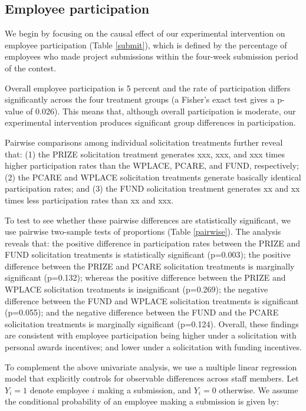 \documentclass[11pt, titlepage]{article}
\begin{document}
\subsection{Employee participation}\label{employee-participation}



We begin by focusing on the causal effect of our experimental
intervention on employee participation (Table \ref{submit}), which is
defined by the percentage of employees who made project submissions
within the four-week submission period of the contest.

Overall employee participation is 5 percent and the rate of
participation differs significantly across the four treatment groups (a
Fisher's exact test gives a p-value of 0.026). This means that, although
overall participation is moderate, our experimental intervention
produces significant group differences in participation.

Pairwise comparisons among individual solicitation treatments further
reveal that: (1) the PRIZE solicitation treatment generates xxx, xxx,
and xxx times higher participation rates than the WPLACE, PCARE, and
FUND, respectively; (2) the PCARE and WPLACE solicitation treatments
generate basically identical participation rates; and (3) the FUND
solicitation treatment generates xx and xx times less participation
rates than xx and xxx.



To test to see whether these pairwise differences are statistically
significant, we use pairwise two-sample tests of proportions (Table
\ref{pairwise}). The analysis reveals that: the positive difference in
participation rates between the PRIZE and FUND solicitation treatments
is statistically significant (p=0.003); the positive difference between
the PRIZE and PCARE solicitation treatments is marginally significant
(p=0.132); whereas the positive difference between the PRIZE and WPLACE
solicitation treatments is insignificant (p=0.269); the negative
difference between the FUND and WPLACE solicitation treatments is
significant (p=0.055); and the negative difference between the FUND and
the PCARE solicitation treatments is marginally significant (p=0.124).
Overall, these findings are consistent with employee participation being
higher under a solicitation with personal awards incentives; and lower
under a solicitation with funding incentives.

To complement the above univariate analysis, we use a multiple linear
regression model that explicitly controls for observable differences
across staff members. Let \(Y_i=1\) denote employee \(i\) making a
submission, and \(Y_i=0\) otherwise. We assume the conditional
probability of an employee making a submission is given by:
\end{document}
